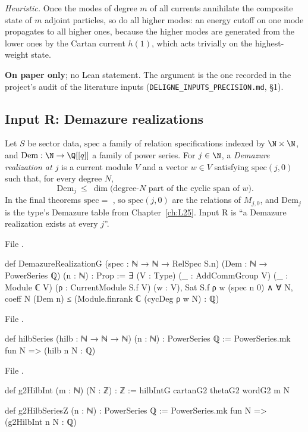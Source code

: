 \begin{physics}
\emph{Heuristic.} Once the modes of degree $m$ of all currents annihilate the composite state of $m$ adjoint particles, so do
all higher modes: an energy cutoff on one mode propagates to all higher ones, because the higher modes are generated from the
lower ones by the Cartan current $h(1)$, which acts trivially on the highest-weight state.
\end{physics}

\begin{status}
\textbf{On paper only}; no Lean statement. The argument is the one recorded in the project's audit of the literature
inputs (\texttt{DELIGNE\_INPUTS\_PRECISION.md}, \S1).
\end{status}

\subsection{Input R: Demazure realizations}\label{l27:sec:realization}

\begin{definition}[Input R]\label{l27:def:realization}
Let $S$ be sector data, $\mathrm{spec}$ a family of relation specifications indexed by $\N\times\N$, and
$\mathrm{Dem}:\N\to\Q[[q]]$ a family of power series. For $j\in\N$, a \emph{Demazure realization at $j$} is a current module
$V$ and a vector $w\in V$ satisfying $\mathrm{spec}(j,0)$ such that, for every degree $N$,
\begin{equation*}
[q^N]\,\mathrm{Dem}_j\ \le\ \dim\bigl(\text{degree-}N\text{ part of the cyclic span of }w\bigr).
\end{equation*}
In the final theorems $\mathrm{spec}=$ , so $\mathrm{spec}(j,0)$ are the relations of $M_{j,0}$, and $\mathrm{Dem}_j$
is the type's Demazure table from Chapter~\ref{ch:L25}. Input R is ``a Demazure realization exists at every $j$''.
\end{definition}
\noindent File .
\begin{leancode}
def DemazureRealizationG (spec : ℕ → ℕ → RelSpec S.n) (Dem : ℕ → PowerSeries ℚ) (n : ℕ) : Prop :=
  ∃ (V : Type) (_ : AddCommGroup V) (_ : Module ℂ V) (ρ : CurrentModule S.f V) (w : V),
    Sat S.f ρ w (spec n 0) ∧ ∀ N, coeff N (Dem n) ≤ (Module.finrank ℂ (cycDeg ρ w N) : ℚ)
\end{leancode}
\noindent File .
\begin{leancode}
def hilbSeries (hilb : ℕ → ℕ → ℕ) (n : ℕ) : PowerSeries ℚ :=
  PowerSeries.mk fun N => (hilb n N : ℚ)
\end{leancode}
\noindent File .
\begin{leancode}
def g2HilbInt (m : ℕ) (N : ℤ) : ℤ := hilbIntG cartanG2 thetaG2 wordG2 m N
\end{leancode}
\begin{leancode}
def g2HilbSeriesZ (n : ℕ) : PowerSeries ℚ := PowerSeries.mk fun N => (g2HilbInt n N : ℚ)
\end{leancode}

